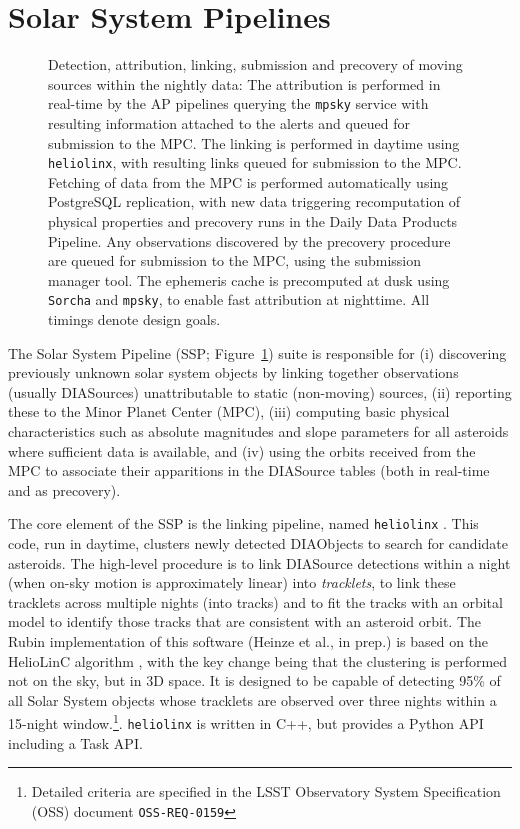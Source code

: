 \section{Solar System Pipelines}
\label{sec:solsys}

\begin{figure}
\begin{center}

\caption{\label{fig:ssp} Detection, attribution, linking, submission and precovery of moving sources within the nightly data: The attribution is performed in real-time by the AP pipelines querying the \texttt{mpsky} service with resulting information attached to the alerts and queued for submission to the MPC.
The linking is performed in daytime using \texttt{heliolinx}, with resulting links queued for submission to the MPC.
Fetching of data from the MPC is performed automatically using PostgreSQL replication, with new data triggering recomputation of physical properties and precovery runs in the Daily Data Products Pipeline.
Any observations discovered by the precovery procedure are queued for submission to the MPC, using the submission manager tool.
The ephemeris cache is precomputed at dusk using \texttt{Sorcha} and \texttt{mpsky}, to enable fast attribution at nighttime.
All timings denote design goals.
}

\end{center}
\end{figure}
The Solar System Pipeline (SSP; Figure~\ref{fig:ssp}) suite is responsible for (i) discovering previously unknown solar system objects by linking together observations (usually DIASources) unattributable to static (non-moving) sources, (ii) reporting these to the Minor Planet Center (MPC), (iii) computing basic physical characteristics such as absolute magnitudes and slope parameters for all asteroids where sufficient data is available, and (iv) using the orbits received from the MPC to associate their apparitions in the DIASource tables (both in real-time and as precovery).

The core element of the SSP is the linking pipeline, named \texttt{heliolinx} \citep{heliolinx}.
This code, run in daytime, clusters newly detected DIAObjects to search for candidate asteroids.
The high-level procedure is to link DIASource detections within a night (when on-sky motion is approximately linear) into {\em tracklets}, to link these tracklets across multiple nights (into tracks) and to fit the tracks with an orbital model to identify those tracks that are consistent with an asteroid orbit.
The Rubin implementation of this software (Heinze et al., in prep.) is based on the HelioLinC algorithm \citep{2018AJ....156..135H}, with the key change being that the clustering is performed not on the sky, but in 3D space.
It is designed to be capable of detecting 95\% of all Solar System objects whose tracklets are observed over three nights within a 15-night window.\footnote{Detailed criteria are specified in the LSST Observatory System Specification (OSS) document \texttt{OSS-REQ-0159}}.
\texttt{heliolinx} is written in C++, but provides a Python API including a Task API.

